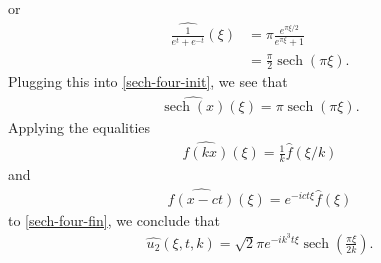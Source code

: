 \documentclass[12pt,reqno]{amsart}
\numberwithin{equation}{section}  %
\newcommand{\wh}{\widehat}
\DeclareMathOperator{\sech}{sech}
\begin{document}
        or
        \begin{equation*}
        \begin{split}
          \wh{\frac{1}{e^{t} + e^{-t}}}(\xi) 
          & =
           \pi \frac{e^{ \pi \xi /2}}{e^{ \pi \xi} + 1}
          \\
          & = \frac{ \pi}{2}  \sech(\pi \xi).
        \end{split}
        \end{equation*}
        Plugging this into \eqref{sech-four-init}, we see that
        \begin{equation}
          \label{sech-four-fin}
        \begin{split}
        \wh{\sech(x)}(\xi) = \pi \sech(\pi \xi).
        \end{split}
        \end{equation}
        Applying the equalities
        \begin{equation}
          \label{four-scale}
        \begin{split}
        \wh{f(kx)}(\xi) = \frac{1}{k}\wh{f}(\xi/k)
        \end{split}
        \end{equation}
        and
        \begin{equation}
          \label{time-trans}
        \begin{split}
          \wh{f(x-ct)}(\xi) = e^{-ict \xi} \wh{f}(\xi)
        \end{split}
        \end{equation}
        to \eqref{sech-four-fin}, we conclude that  
        \begin{equation}
          \label{mkdv-sol-four}
        \begin{split}
          \wh{u_{2}}(\xi, t, k) =
          \sqrt{2} \pi e^{-ik^{3}t \xi} \sech \left (\frac{\pi
          \xi}{2k} \right ).
        \end{split}
        \end{equation}
\end{document}
